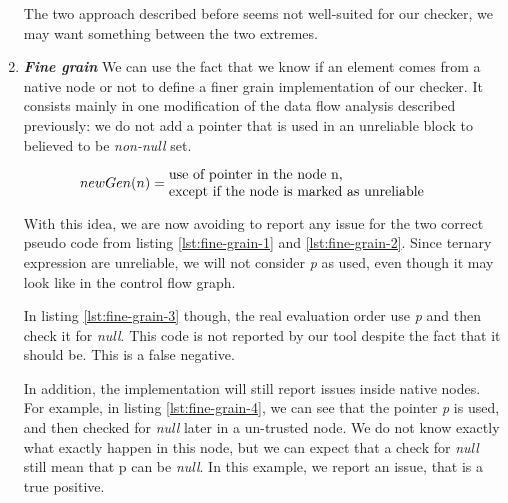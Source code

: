 \begin{enumerate}
The two approach described before seems not well-suited for our checker, we may want something between the two extremes.

\item \textbf{\textit{Fine grain}} \newline
We can use the fact that we know if an element comes from a native node or not to define a finer grain implementation of our checker. 
It consists mainly in one modification of the data flow analysis described previously: we do not add a pointer that is used in an unreliable block to believed to be \emph{non-null} set.

\begin{equation}\label{eqn:new_dataflow4}
newGen(n) = \parbox{7cm}{use of pointer in the node n, \newline except if the node is marked as unreliable}
\end{equation}





With this idea, we are now avoiding to report any issue for the two correct pseudo code from listing \ref{lst:fine-grain-1} and \ref{lst:fine-grain-2}. Since ternary expression are unreliable, we will not consider \emph{p} as used, even though it may look like in the control flow graph.



In listing \ref{lst:fine-grain-3} though, the real evaluation order use \emph{p} and then check it for \emph{null}. 
This code is not reported by our tool despite the fact that it should be. This is a false negative.\newline



In addition, the implementation will  still report issues inside native nodes.
For example, in listing \ref{lst:fine-grain-4}, we can see that the pointer \emph{p} is used, and then checked for \emph{null} later in a un-trusted node. We do not know exactly what exactly happen in this node, but we can expect that a check for \emph{null} still mean that p can be \emph{null}. 
In this example, we report an issue, that is a true positive.
\end{enumerate}

